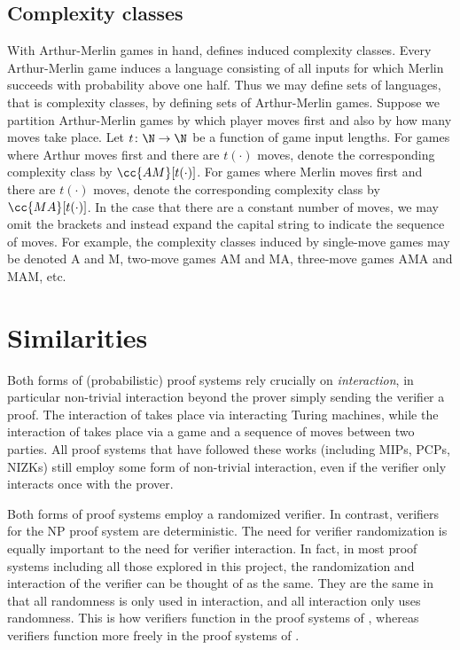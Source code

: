 \subsection{Complexity classes}

With Arthur-Merlin games in hand, \cite{Bab85} defines induced complexity classes.
Every Arthur-Merlin game induces a language consisting of all inputs for which Merlin succeeds with probability above one half. 
Thus we may define sets of languages, that is complexity classes, by defining sets of Arthur-Merlin games.
Suppose we partition Arthur-Merlin games by which player moves first and also by how many moves take place.
Let $t\colon\N\to\N$ be a function of game input lengths. 
For games where Arthur moves first and there are $t(\cdot)$ moves, denote the corresponding complexity class by $\cc{AM}[t(\cdot)]$.
For games where Merlin moves first and there are $t(\cdot)$ moves, denote the corresponding complexity class by $\cc{MA}[t(\cdot)]$.
In the case that there are a constant number of moves, we may omit the brackets and instead expand the capital string to indicate the sequence of moves.
For example, the complexity classes induced by single-move games may be denoted A and M, two-move games AM and MA, three-move games AMA and MAM, etc.


\section{Similarities}

Both forms of (probabilistic) proof systems rely crucially on \emph{interaction}, in particular non-trivial interaction beyond the prover simply sending the verifier a proof.
The interaction of \cite{GMR85} takes place via interacting Turing machines, while the interaction of \cite{Bab85} takes place via a game and a sequence of moves between two parties.
All proof systems that have followed these works (including MIPs, PCPs, NIZKs) still employ some form of non-trivial interaction, even if the verifier only interacts once with the prover.

Both forms of proof systems employ a randomized verifier.
In contrast, verifiers for the NP proof system are deterministic.
The need for verifier randomization is equally important to the need for verifier interaction.
In fact, in most proof systems including all those explored in this project, the randomization and interaction of the verifier can be thought of as the same.
They are the same in that all randomness is only used in interaction, and all interaction only uses randomness.
This is how verifiers function in the proof systems of \cite{Bab85}, whereas verifiers function more freely in the proof systems of \cite{GMR85}.

